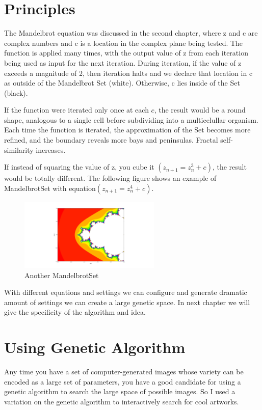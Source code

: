 \documentclass[fleqn,10pt]{SelfArx} %
\begin{document}
\section{Principles}


The Mandelbrot equation was discussed in the second chapter, where z
and c are complex numbers and c is a location in the complex plane
being tested. The function is applied many times, with the output
value of z from each iteration being used as input for the next
iteration. During iteration, if the value of z exceeds a magnitude of
2, then iteration halts and we declare that location in c as outside
of the Mandelbrot Set (white). Otherwise, c lies inside of the Set
(black).

If the function were iterated only once at each $c$, the result would be a round shape, analogous to a single cell before subdividing into a multicelullar organism. Each time the function is iterated, the approximation of the Set becomes more refined, and the boundary reveals more bays and peninsulas.
Fractal self-similarity increases.

If instead of squaring the value of z, you cube it $(z_{n+1} = z_n^3 +
c)$, the result would be totally different. The following figure shows
an example of MandelbrotSet with equation$(z_{n+1} = z_n^4 +
c)$.



\begin{figure}[h!]
  \centering
      \includegraphics[width=0.6\textwidth]{figure_2.png}
  \caption{Another MandelbrotSet}
\end{figure}

With different equations and settings we can configure and generate
dramatic amount of settings we can create a large genetic space. In
next chapter we will give the specificity of the algorithm and idea.


\section{Using Genetic Algorithm}

Any time you have a set of computer-generated images whose variety can be encoded as a large set of parameters, you have a good candidate for using a genetic algorithm to search the large space of possible images. So I used a variation on the genetic algorithm to interactively search for cool artworks.
\end{document}
